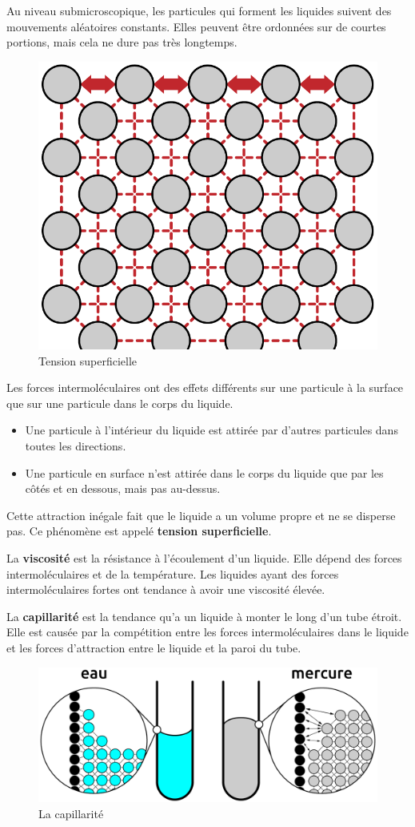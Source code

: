\documentclass[
  11pt,
  a4paper,
  openany]{book}
\providecommand{\tightlist}{%
  \setlength{\itemsep}{0pt}\setlength{\parskip}{0pt}}
\begin{document}
Au niveau submicroscopique, les particules qui forment les liquides suivent des mouvements aléatoires constants. Elles peuvent être ordonnées sur de courtes portions, mais cela ne dure pas très longtemps.

\begin{figure}

{\centering \includegraphics[width=0.33\linewidth]{images/tension-surface} 

}

\caption{Tension superficielle}\label{fig:tension-surface}
\end{figure}

Les forces intermoléculaires ont des effets différents sur une particule à la surface que sur une particule dans le corps du liquide.

\begin{itemize}
\tightlist
\item
  Une particule à l'intérieur du liquide est attirée par d'autres particules dans toutes les directions.
\item
  Une particule en surface n'est attirée dans le corps du liquide que par les côtés et en dessous, mais pas au-dessus.
\end{itemize}

Cette attraction inégale fait que le liquide a un volume propre et ne se disperse pas. Ce phénomène est appelé \textbf{tension superficielle}.

La \textbf{viscosité} est la résistance à l'écoulement d'un liquide. Elle dépend des forces intermoléculaires et de la température. Les liquides ayant des forces intermoléculaires fortes ont tendance à avoir une viscosité élevée.

La \textbf{capillarité} est la tendance qu'a un liquide à monter le long d'un tube étroit. Elle est causée par la compétition entre les forces intermoléculaires dans le liquide et les forces d'attraction entre le liquide et la paroi du tube.

\begin{figure}

{\centering \includegraphics[width=0.67\linewidth]{images/capillarity} 

}

\caption{La capillarité}\label{fig:capillarity}
\end{figure}
\end{document}
